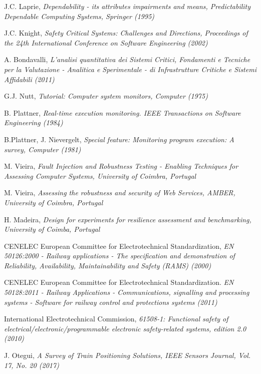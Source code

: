 \begin{thebibliography}{9}
J.C. Laprie, \textit{Dependability - its attributes impairments and means, Predictability Dependable Computing Systems, Springer (1995)}

J.C. Knight, \textit{Safety Critical Systems: Challenges and Directions, Proceedings of the 24th International Conference on Software Engineering (2002)}

A. Bondavalli, \textit{L'analisi quantitativa dei Sistemi Critici, Fondamenti e Tecniche per la Valutazione - Analitica e Sperimentale - di Infrastrutture Critiche e Sistemi Affidabili (2011)}

G.J. Nutt, \textit{Tutorial: Computer system monitors, Computer (1975)}

B. Plattner, \textit{Real-time execution monitoring. IEEE Transactions on Software Engineering (1984)}

B.Plattner, J. Nievergelt, \textit{Special feature: Monitoring program execution: A survey, Computer (1981)}

M. Vieira, \emph{Fault Injection and
Robustness Testing - Enabling
Techniques for Assessing
Computer Systems, University
of Coimbra, Portugal}

M. Vieira, \emph{Assessing the
	robustness and security of Web
	Services, AMBER, University of
	Coimbra, Portugal}

H. Madeira, \emph{Design for experiments for resilience assessment and benchmarking, University of Coimba, Portugal}

CENELEC European Committee for Electrotechnical Standardization, \textit{EN 50126:2000 - Railway applications - The specification and demonstration of Reliability, Availability, Maintainability and Safety (RAMS) (2000)}

CENELEC European Committee for Electrotechnical Standardization. \textit{EN 50128:2011 - Railway Applications - Communications, signalling and processing systems - Software for railway control and protections systems (2011)}

International Electrotechnical Commission, \textit{61508-1: Functional safety of electrical/electronic/programmable electronic safety-related systems, edition 2.0 (2010)}


J. Otegui, \textit{A Survey of Train Positioning Solutions, IEEE Sensors Journal, Vol. 17, No. 20 (2017)}


\end{thebibliography}
